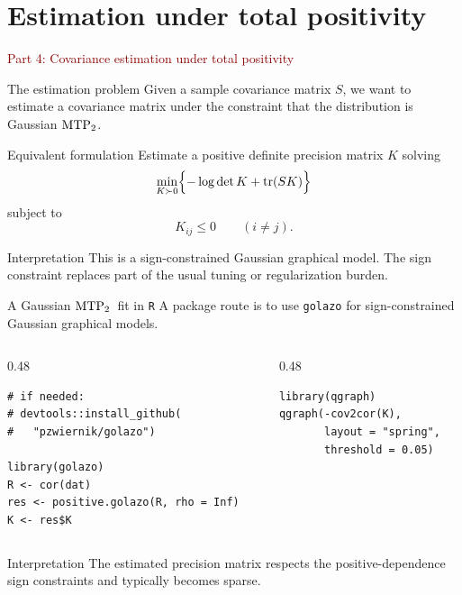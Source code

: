 \documentclass[dvipsnames,aspectratio=169,handout]{beamer}
\begin{document}

\section{Estimation under total positivity}

\begin{frame}{}
\begin{center}
{\Huge \textcolor{DarkRed}{Part 4: Covariance estimation under total positivity}}
\end{center}
\end{frame}

\begin{frame}{The estimation problem}
Given a sample covariance matrix $S$, we want to estimate a covariance matrix under the constraint that the distribution is Gaussian ${\rm MTP}_{2}$.

\begin{block}{Equivalent formulation}
Estimate a positive definite precision matrix $K$ solving
\[
\min_{K\succ 0}
\Bigl\{-\log\det K + \operatorname{tr}(SK)\Bigr\}
\]
subject to
\[
K_{ij}\leq 0 \qquad (i\neq j).
\]
\end{block}

\begin{alertblock}{Interpretation}
This is a sign-constrained Gaussian graphical model.
The sign constraint replaces part of the usual tuning or regularization burden.
\end{alertblock}
\end{frame}

\begin{frame}[fragile]{A Gaussian ${\rm MTP}_{2}$\ fit in \texttt{R}}
A package route is to use \texttt{golazo} for sign-constrained Gaussian graphical models.

\begin{columns}[T,onlytextwidth]
\begin{column}{0.48\textwidth}
\begin{lstlisting}
# if needed:
# devtools::install_github(
#   "pzwiernik/golazo")

library(golazo)
R <- cor(dat)
res <- positive.golazo(R, rho = Inf)
K <- res$K
\end{lstlisting}
\end{column}
\begin{column}{0.48\textwidth}
\begin{lstlisting}
library(qgraph)
qgraph(-cov2cor(K),
       layout = "spring",
       threshold = 0.05)
\end{lstlisting}
\end{column}
\end{columns}

\begin{alertblock}{Interpretation}
The estimated precision matrix respects the positive-dependence sign constraints and typically becomes sparse.
\end{alertblock}
\end{frame}
\end{document}
